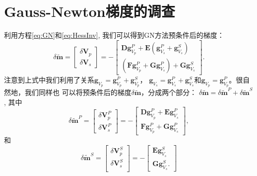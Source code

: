 \chapter{Gauss-Newton梯度的调查}
\label{cha:InvestigationOfGNGradient}
利用方程\eqref{eq:GN}和\eqref{eq:HessInv}, 我们可以得到GN方法预条件后的梯度：
\begin{equation}
        \delta \mathbf{\tilde{m}}=
        \begin{bmatrix}
                \delta \mathbf{V}_p\\
                \delta\mathbf{V}_s
        \end{bmatrix}
        =-
        \begin{bmatrix}
                \mathbf{D}\mathbf{g}^P_{V_p} +
                \mathbf{E}(\mathbf{g}^P_{V_s}+\mathbf{g}^S_{V_s})\\
                (\mathbf{F}\mathbf{g}^P_{V_p}+\mathbf{G}\mathbf{g}^P_{V_s}) +
                \mathbf{G}\mathbf{g}^S_{V_s}
        \end{bmatrix}.
        \label{eq:PreGN}
\end{equation}
注意到上式中我们利用了关系$\mathbf{g}_{V_p}=\mathbf{g}^P_{V_p}+\mathbf{g}^S_{V_p}$，
$\mathbf{g}_{V_s}=\mathbf{g}^P_{V_s}+\mathbf{g}^S_{V_s}$和$\mathbf{g}_{V_p}=\mathbf{g}^P_{V_p}$。很自然地，我们同样也
可以将预条件后的梯度$\delta\mathbf{\tilde{m}}$，分成两个部分：
$\delta \mathbf{\tilde{m}} = \delta \mathbf{\tilde{m}}^P+\delta
\mathbf{\tilde{m}}^S$, 其中
\begin{equation}
        \delta \mathbf{\tilde{m}}^P=
        \begin{bmatrix}
                \delta \mathbf{V}^P_p\\
                \delta \mathbf{V}^P_s
        \end{bmatrix}
        =-
        \begin{bmatrix}
                \mathbf{D}\mathbf{g}^P_{V_p} +
                \mathbf{E}\mathbf{g}^P_{V_s}\\
                \mathbf{F}\mathbf{g}^P_{V_p}+\mathbf{G}\mathbf{g}^P_{V_s}
        \end{bmatrix},
        \label{eq:PreGNP}
\end{equation}
和
\begin{equation}
        \delta \mathbf{\tilde{m}}^S=
        \begin{bmatrix}
                \delta \mathbf{V}^S_p\\
                \delta \mathbf{V}^S_s\\
        \end{bmatrix}
        =-
        \begin{bmatrix}
                \mathbf{E}\mathbf{g}^S_{V_s}\\
                \mathbf{G}\mathbf{g}^S_{V_s}.
        \end{bmatrix}
        \label{eq:PreGNS}
\end{equation}
